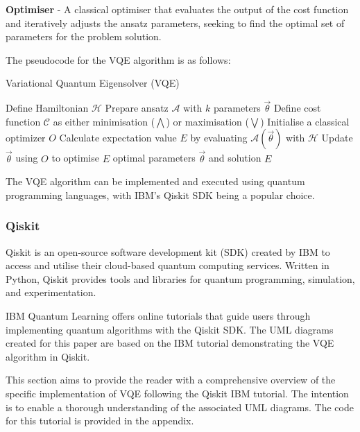 \documentclass{article}
\newcounter{subsubsubsection}[subsubsection]
\begin{document}
{\textbf{Optimiser} - A classical optimiser that evaluates the output of the cost function and iteratively adjusts the ansatz parameters, seeking to find the optimal set of parameters for the problem solution\cite{Tutorial}\cite{vqeqiskit}. 

The pseudocode for the VQE algorithm is as follows:

\begin{algorithm}[H]
\caption{Variational Quantum Eigensolver (VQE)}\label{vqe_algorithm}
\begin{algorithmic}[1]
\State Define Hamiltonian \( \mathcal{H} \)
\State Prepare ansatz \( \mathcal{A} \) with \( k \) parameters \( \overrightarrow{\theta} \)
\State Define cost function $\mathcal{C}$ as either minimisation ($\bigwedge$) or maximisation ($\bigvee$)
\State Initialise a classical optimizer \( O \)
    \State Calculate expectation value \( E \) by evaluating \( \mathcal{A}(\overrightarrow{\theta}) \) with \( \mathcal{H} \)
    \State Update \( \overrightarrow{\theta} \) using \( O \) to optimise \( E \)
\EndWhile
\State \Return optimal parameters \( \overrightarrow{\theta} \) and solution \( E \)
\end{algorithmic}
\end{algorithm}

The VQE algorithm can be implemented and executed using quantum programming languages, with IBM’s Qiskit SDK being a popular choice.

\subsubsection{Qiskit}

Qiskit is an open-source software development kit (SDK) created by IBM to access and utilise their cloud-based quantum computing services. Written in Python, Qiskit provides tools and libraries for quantum programming, simulation, and experimentation.

IBM Quantum Learning offers online tutorials\cite{Tutorial} that guide users through implementing quantum algorithms with the Qiskit SDK. The UML diagrams created for this paper are based on the IBM tutorial demonstrating the VQE algorithm in Qiskit\cite{IBMVQETut}.


This section aims to provide the reader with a comprehensive overview of the specific implementation of VQE following the Qiskit IBM tutorial\cite{Tutorial}. The intention is to enable a thorough understanding of the associated UML diagrams. The code for this tutorial is provided in the appendix.

}
\end{document}
